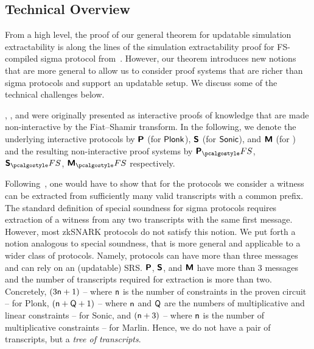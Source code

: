 \subsection{Technical Overview}

From a high level, the proof of our general theorem for updatable simulation
extractability is along the lines of the simulation extractability proof for
FS-compiled sigma protocol from~\cite{INDOCRYPT:FKMV12}. However, our theorem
introduces new notions that are more general to allow us to consider proof
systems that are richer than sigma protocols and support an updatable setup. We
discuss some of the technical challenges below.

\plonk{}, \sonic{}, and \marlin{} were originally presented as interactive
proofs of knowledge that are made non-interactive by the Fiat--Shamir transform.
In the following, we denote the underlying interactive protocols by $\bm{\mathsf{P}}$
(for $\textnormal{\textsf{Plonk}}$), $\bm{\mathsf{S}}$ (for ${\textnormal{\textsf{Sonic}}}$), and $\bm{\mathsf{M}}$ (for \marlin) and
the resulting non-interactive proof systems by $\plonkprotfs$, $\sonicprotfs$,
$\marlinprotfs$ respectively.

Following~\cite{INDOCRYPT:FKMV12}, one would have to show that for the protocols
we consider a witness can be extracted from sufficiently many valid transcripts
with a common prefix. The standard definition of special soundness for sigma
protocols requires extraction of a witness from any two transcripts with the
same first message. However, most zkSNARK protocols do not satisfy this notion.
We put forth a notion analogous to special soundness, that is more general and
applicable to a wider class of protocols. Namely, protocols can have more than three
messages and can rely on an (updatable) SRS. $\bm{\mathsf{P}}$, $\bm{\mathsf{S}}$, and
$\bm{\mathsf{M}}$ have more than 3 messages and the number of transcripts required for extraction is more
than two. Concretely, $(3 \mathsf{n} + 1)$ -- where $\mathsf{n}$ is the number of
constraints in the proven circuit -- for Plonk, $(\mathsf{n} + \mathsf{Q} + 1)$
-- where $\mathsf{n}$ and $\mathsf{Q}$ are the numbers of multiplicative and
linear constraints -- for Sonic, and $(\mathsf{n} + 3)$ -- where $\mathsf{n}$
is the number of multiplicative constraints -- for Marlin. Hence, we do not have
a pair of transcripts, but a \emph{tree of transcripts}.

